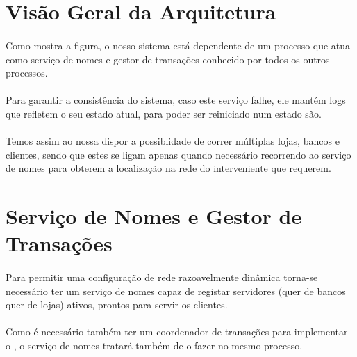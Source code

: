 \documentclass[11pt,a4paper]{report}
\begin{document}
\section{Visão Geral da Arquitetura}

%


\paragraph{}Como mostra a figura, o nosso sistema está dependente de um processo que atua como serviço de nomes e gestor de transações conhecido por todos os outros processos.

\paragraph{}Para garantir a consistência do sistema, caso este serviço falhe, ele mantém logs que refletem o seu estado atual, para poder ser reiniciado num estado são.

\paragraph{}Temos assim ao nossa dispor a possiblidade de correr múltiplas lojas, bancos e clientes, sendo que estes se ligam apenas quando necessário recorrendo ao serviço de nomes para obterem a localização na rede do interveniente que requerem.

\section{Serviço de Nomes e Gestor de Transações}

\paragraph{}Para permitir uma configuração de rede razoavelmente dinâmica torna-se necessário ter um serviço de nomes capaz de registar servidores (quer de bancos quer de lojas) ativos, prontos para servir os clientes.

\paragraph{}Como é necessário também ter um coordenador de transações para implementar o , o serviço de nomes tratará também de o fazer no mesmo processo.
\end{document}
